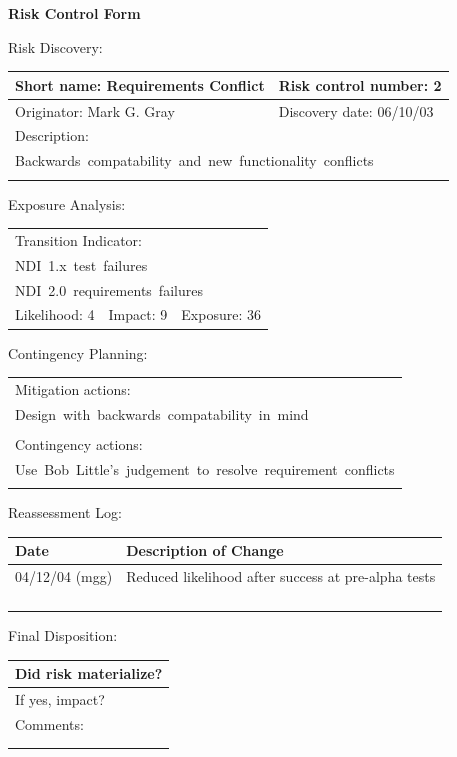 \documentclass{article}
\begin{document}
\begin{center}\Large\bf
Risk Control Form
\end{center}
\vspace{24pt}

Risk Discovery:

\begin{tabular}{|p{211pt}|p{211pt}|} \hline
Short name: Requirements Conflict & Risk control number: 2\\ \hline
Originator: Mark G. Gray & Discovery date: 06/10/03 \\ \hline
\multicolumn{2}{|l|}{Description:} \\
\multicolumn{2}{|l|}{\mbox{Backwards compatability and new
functionality conflicts}} \\
\multicolumn{2}{|l|}{\mbox{}} \\ \hline
\end{tabular}
\vspace{24pt}

Exposure Analysis:

\begin{tabular}{|p{138pt}|p{138pt}|p{138pt}|} \hline
\multicolumn{3}{|l|}{Transition Indicator:} \\
\multicolumn{3}{|l|}{\mbox{NDI 1.x test failures}} \\
\multicolumn{3}{|l|}{\mbox{NDI 2.0 requirements failures}} \\ \hline
Likelihood: 4 & Impact: 9 & Exposure: 36 \\ \hline
\end{tabular}
\vspace{24pt}

Contingency Planning:

\begin{tabular}{|p{433pt}|} \hline
Mitigation actions: \\
\mbox{Design with backwards compatability in mind} \\
\mbox{} \\ \hline
Contingency actions: \\
\mbox{Use Bob Little's judgement to resolve requirement conflicts} \\
\mbox{} \\ \hline
\end{tabular}
\vspace{24pt}

Reassessment Log:

\begin{tabular}{|p{72pt}|p{351pt}|} \hline
Date & Description of Change \\ \hline
04/12/04 (mgg) & Reduced likelihood after success at pre-alpha tests \\ \hline
\mbox{} & \mbox{} \\ \hline
\mbox{} & \mbox{} \\ \hline
\mbox{} & \mbox{} \\ \hline
\mbox{} & \mbox{} \\ \hline
\end{tabular}
\vspace{24pt}

Final Disposition:

\begin{tabular}{|p{433pt}|} \hline
Did risk materialize? \\ \hline
If yes, impact? \\ \hline
Comments: \\
\mbox{} \\
\mbox{} \\ \hline
\end{tabular}
\end{document}
